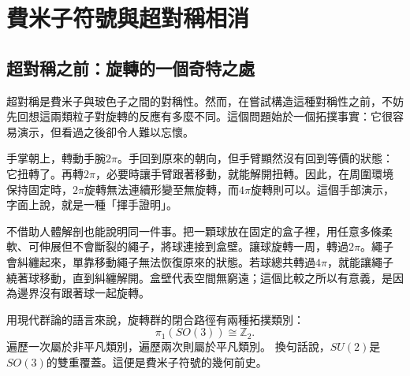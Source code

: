 \chapter{費米子符號與超對稱相消}


\section{超對稱之前：旋轉的一個奇特之處}

超對稱是費米子與玻色子之間的對稱性。然而，在嘗試構造這種對稱性之前，不妨先回想這兩類粒子對旋轉的反應有多麼不同。這個問題始於一個拓撲事實：它很容易演示，但看過之後卻令人難以忘懷。

手掌朝上，轉動手腕\(2\pi\)。手回到原來的朝向，但手臂顯然沒有回到等價的狀態：它扭轉了。再轉\(2\pi\)，必要時讓手臂跟著移動，就能解開扭轉。因此，在周圍環境保持固定時，\(2\pi\)旋轉無法連續形變至無旋轉，而\(4\pi\)旋轉則可以。這個手部演示，字面上說，就是一種「揮手證明」。

不借助人體解剖也能說明同一件事。把一顆球放在固定的盒子裡，用任意多條柔軟、可伸展但不會斷裂的繩子，將球連接到盒壁。讓球旋轉一周，轉過\(2\pi\)。繩子會糾纏起來，單靠移動繩子無法恢復原來的狀態。若球總共轉過\(4\pi\)，就能讓繩子繞著球移動，直到糾纏解開。盒壁代表空間無窮遠；這個比較之所以有意義，是因為邊界沒有跟著球一起旋轉。

\begin{classroomqa}
\end{classroomqa}

\begin{classroomqa}
\end{classroomqa}

用現代群論的語言來說，旋轉群的閉合路徑有兩種拓撲類別：
\begin{equation}
\pi_1\!\left(SO(3)\right)\cong \mathbb Z_2.
\end{equation}
遍歷一次屬於非平凡類別，遍歷兩次則屬於平凡類別。
換句話說，\(SU(2)\)是\(SO(3)\)的雙重覆蓋。這便是費米子符號的幾何前史。

